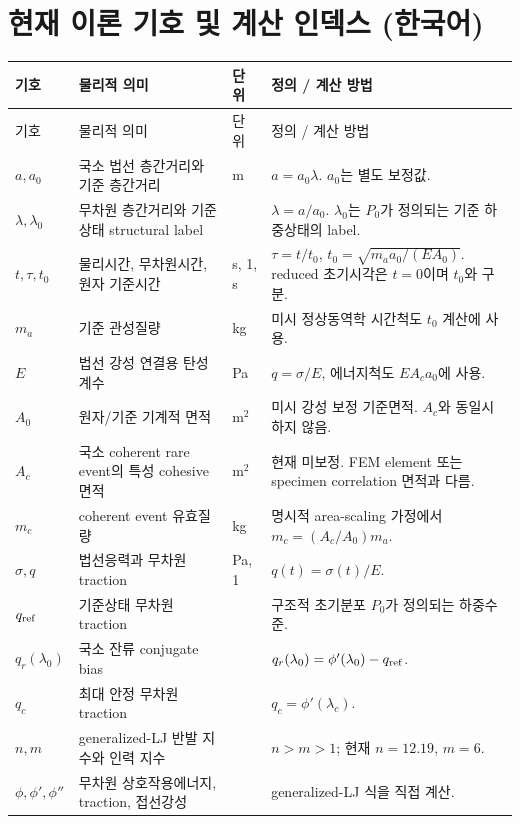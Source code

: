 \section*{현재 이론 기호 및 계산 인덱스 (한국어)}
\small
\begin{longtable}{>{\raggedright\arraybackslash}p{}>{\raggedright\arraybackslash}p{}>{\raggedright\arraybackslash}p{}>{\raggedright\arraybackslash}p{}}
\toprule
기호 & 물리적 의미 & 단위 & 정의 / 계산 방법 \\
\midrule
\endfirsthead
\toprule
기호 & 물리적 의미 & 단위 & 정의 / 계산 방법 \\
\midrule
\endhead
\bottomrule
\endfoot
$a,a_0$ & 국소 법선 층간거리와 기준 층간거리 & m & $a=a_0\lambda$. $a_0$는 별도 보정값. \\
$\lambda,\lambda_0$ & 무차원 층간거리와 기준상태 structural label & 1 & $\lambda=a/a_0$. $\lambda_0$는 $P_0$가 정의되는 기준 하중상태의 label. \\
$t,\tau,t_0$ & 물리시간, 무차원시간, 원자 기준시간 & s, 1, s & $\tau=t/t_0$, $t_0=\sqrt{m_a a_0/(EA_0)}$. reduced 초기시각은 $t=0$이며 $t_0$와 구분. \\
$m_a$ & 기준 관성질량 & kg & 미시 정상동역학 시간척도 $t_0$ 계산에 사용. \\
$E$ & 법선 강성 연결용 탄성계수 & Pa & $q=\sigma/E$, 에너지척도 $EA_ca_0$에 사용. \\
$A_0$ & 원자/기준 기계적 면적 & m$^2$ & 미시 강성 보정 기준면적. $A_c$와 동일시하지 않음. \\
$A_c$ & 국소 coherent rare event의 특성 cohesive 면적 & m$^2$ & 현재 미보정. FEM element 또는 specimen correlation 면적과 다름. \\
$m_c$ & coherent event 유효질량 & kg & 명시적 area-scaling 가정에서 $m_c=(A_c/A_0)m_a$. \\
$\sigma,q$ & 법선응력과 무차원 traction & Pa, 1 & $q(t)=\sigma(t)/E$. \\
$q_{\rm ref}$ & 기준상태 무차원 traction & 1 & 구조적 초기분포 $P_0$가 정의되는 하중수준. \\
$q_r(\lambda_0)$ & 국소 잔류 conjugate bias & 1 & $q_r(\lambda_0)=\phi'(\lambda_0)-q_{\rm ref}$. \\
$q_c$ & 최대 안정 무차원 traction & 1 & $q_c=\phi'(\lambda_c)$. \\
$n,m$ & generalized-LJ 반발 지수와 인력 지수 & 1 & $n>m>1$; 현재 $n=12.19$, $m=6$. \\
$\phi,\phi',\phi''$ & 무차원 상호작용에너지, traction, 접선강성 & 1 & generalized-LJ 식을 직접 계산. \\

\end{longtable}
